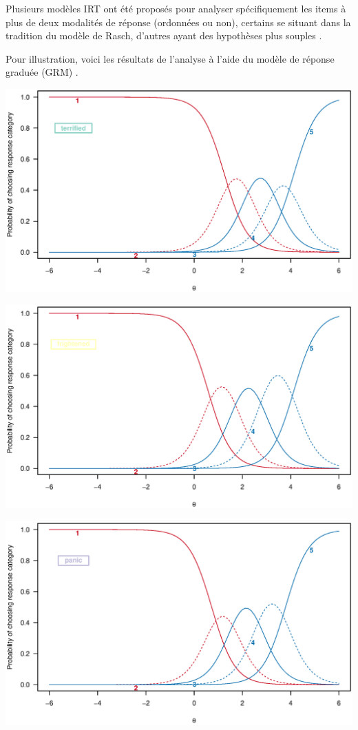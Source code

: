 
Plusieurs modèles IRT ont été proposés pour analyser spécifiquement les items à
plus de deux modalités de réponse (ordonnées ou non), certains se situant dans
la tradition du modèle de Rasch, d'autres ayant des hypothèses plus souples
\autocite{Hays2000,rao06}. 

Pour illustration, voici les résultats de l'analyse à l'aide du modèle de
réponse graduée (GRM) \autocite{Samejima1969}.


\foilhead{}

{\centering \includegraphics[width=.8\textwidth]{figs/anxiety_grmcons_it1.eps}\par}

\foilhead{}

{\centering \includegraphics[width=.8\textwidth]{figs/anxiety_grmcons_it2.eps}\par}

\foilhead{}

{\centering \includegraphics[width=.8\textwidth]{figs/anxiety_grmcons_it3.eps}\par}

